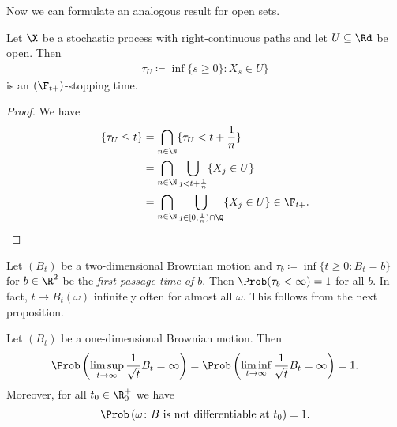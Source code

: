 Now we can formulate an analogous result for open sets.
\begin{lem}
Let $\X$ be a stochastic process with right-continuous paths and let $U \subseteq \Rd$ be open.
Then
\begin{align*}
\tau_U \coloneqq \inf\{s\geq 0\} \colon X_s \in U\}
\end{align*}
is an $(\F_{t+})$-stopping time.
\end{lem}
\begin{proof}
We have
\begin{align*}
\{\tau_U \leq t\} &= \bigcap_{n\in \N} \{\tau_U<t+\frac{1}{n}\}\\
&=\bigcap_{n\in \N}\bigcup_{j<t+\frac{1}{n}} \{X_j \in U\}\\
&=\bigcap_{n\in \N}\bigcup_{j \in [0,\frac{1}{n})\cap \Q} \{X_j \in U\} \in \F_{t+}. \qedhere
\end{align*}
\end{proof}

\begin{bsp}
Let $(B_t)$ be a two-dimensional Brownian motion and $\tau_b\coloneqq \inf\{t \geq 0 \colon B_t=b\}$ for $b\in \R^2$ be the \emph{first passage time of $b$}.
Then $\Prob(\tau_b<\infty)=1$ for all $b$.
In fact, $t \mapsto B_t(\omega)$ infinitely often for almost all $\omega$. This follows from the next proposition.
\end{bsp}

\begin{prop}
Let $(B_t)$ be a one-dimensional Brownian motion.
Then
\begin{align*}
\Prob\left(\limsup_{t \to \infty} \frac{1}{\sqrt{t}} B_t=\infty\right)=\Prob\left(\liminf_{t \to \infty} \frac{1}{\sqrt{t}} B_t=\infty\right)=1.
\end{align*}
Moreover, for all $t_0 \in \R_0^+$ we have
\begin{align*}
\Prob\left(\omega \colon B \text{ is not differentiable at } t_0 \right)=1.
\end{align*}
\end{prop}

